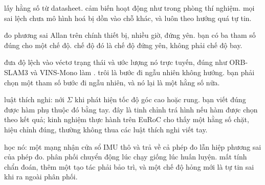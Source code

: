 \documentclass[../../deep_learning.tex]{subfiles}
\begin{document}
\begin{mach}
\item {} \gp lấy hằng số từ datasheet. \gd cảm biến hoạt động như trong phòng thí nghiệm. \gia mọi sai lệch chưa mô hình hoá bị dồn vào chỗ khác, và luôn theo hướng quá tự tin.
\item {} \gp đo phương sai Allan trên chính thiết bị, nhiều giờ, đứng yên. \hq bạn có ba tham số đúng cho một chế độ. \vdm chế độ đó là chế độ đứng yên, không phải chế độ bay.
\item {} \gp đưa độ lệch vào véctơ trạng thái và ước lượng nó trực tuyến, đúng như ORB-SLAM3 và VINS-Mono làm \cite{campos2021orbslam3,qin2018vinsmono}. \gd trôi là bước đi ngẫu nhiên không hướng. \gia bạn phải chọn một tham số bước đi ngẫu nhiên, và nó lại là một hằng số nữa.
\item {} \gp luật thích nghi: nới \(\Sigma\) khi phát hiện tốc độ góc cao hoặc rung. \gd bạn viết đúng được hàm phụ thuộc đó bằng tay. \gia đây là tinh chỉnh trá hình nếu hàm được chọn theo kết quả; kinh nghiệm thực hành trên EuRoC cho thấy một hằng số chặt, hiệu chỉnh đúng, thường không thua các luật thích nghi viết tay.
\item {} \gp học nó: một mạng nhận cửa sổ IMU thô và trả về cả phép đo lẫn hiệp phương sai của phép đo. \gd phân phối chuyển động lúc chạy giống lúc huấn luyện. \gia mất tính chẩn đoán, thêm một tạo tác phải bảo trì, và một chế độ hỏng mới là tự tin sai khi ra ngoài phân phối.
\end{mach}
\end{document}

